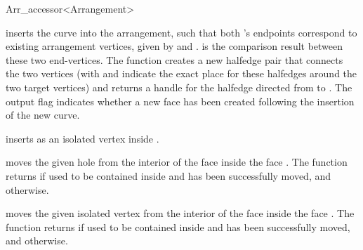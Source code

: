 \begin{ccRefClass}{Arr_accessor<Arrangement>}
\begin{ccAdvanced}
  {inserts the curve  into the arrangement, such that both 's
   endpoints correspond to existing arrangement vertices, given by
    and .  is the comparison
   result between these two end-vertices. The function creates a
   new halfedge pair that connects the two vertices (with  and
    indicate the exact place for these halfedges around the two
   target vertices) and returns a handle for the halfedge directed from
    to .
   The output flag  indicates whether a new face has been created
   following the insertion of the new curve.
   }

    {inserts  as an isolated vertex inside .
     }

    {moves the given hole from the interior of the face  inside the face .
     The function returns  if  used to be contained inside
      and has been successfully moved, and  otherwise.
     }

    {moves the given isolated vertex from the interior of the face  inside the
     face . The function returns  if  used to be contained inside
      and has been successfully moved, and  otherwise.
     }


\end{ccAdvanced}
\end{ccRefClass}
